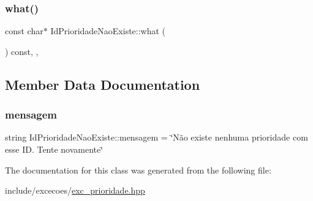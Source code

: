 \subsubsection{\texorpdfstring{what()}{what()}}
{\footnotesize\ttfamily const char$\ast$ Id\+Prioridade\+Nao\+Existe\+::what (\begin{DoxyParamCaption}{ }\end{DoxyParamCaption}) const\hspace{0.3cm}{\ttfamily [inline]}, {\ttfamily [override]}, {\ttfamily [noexcept]}}



\subsection{Member Data Documentation}
\mbox{\label{classIdPrioridadeNaoExiste_a0dc8383d0ca6ae78bf02a7429604bf63}} 
\subsubsection{\texorpdfstring{mensagem}{mensagem}}
{\footnotesize\ttfamily string Id\+Prioridade\+Nao\+Existe\+::mensagem = \char`\"{}Não existe nenhuma prioridade com esse I\+D. Tente novamente\char`\"{}\hspace{0.3cm}{\ttfamily [private]}}



The documentation for this class was generated from the following file\+:\begin{DoxyCompactItemize}
\item 
include/excecoes/\hyperlink{exc__prioridade_8hpp}{exc\+\_\+prioridade.\+hpp}\end{DoxyCompactItemize}
